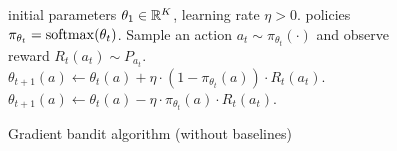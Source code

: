\begin{figure}[t]
\centering
\vskip -0.1in
\begin{minipage}{.7\linewidth}
    \begin{algorithm}[H]
    \caption{Gradient bandit algorithm (without baselines)}
    \label{alg:gradient_bandit_algorithm_sampled_reward}
    \begin{algorithmic}
     initial parameters $\theta_1 \in {\mathbb{R}}^K$, learning rate $\eta > 0$.
     policies $\pi_{\theta_t} = \mathrm{softmax}(\theta_t)$.
   \STATE Sample an action $a_t \sim \pi_{\theta_t}(\cdot)$ and observe reward $R_t(a_t)\sim P_{a_t}$.
   \STATE $\theta_{t+1}(a) \gets \theta_t(a) + \eta \cdot \left( 1 - \pi_{\theta_t}(a) \right) \cdot R_t(a_t)$.
   \ELSE
   \STATE $\theta_{t+1}(a) \gets \theta_t(a) - \eta \cdot \pi_{\theta_t}(a) \cdot R_t(a_t)$.
   \ENDIF
   \ENDFOR
   \ENDWHILE
   \end{algorithmic}
    \end{algorithm}
\end{minipage}
\end{figure}

